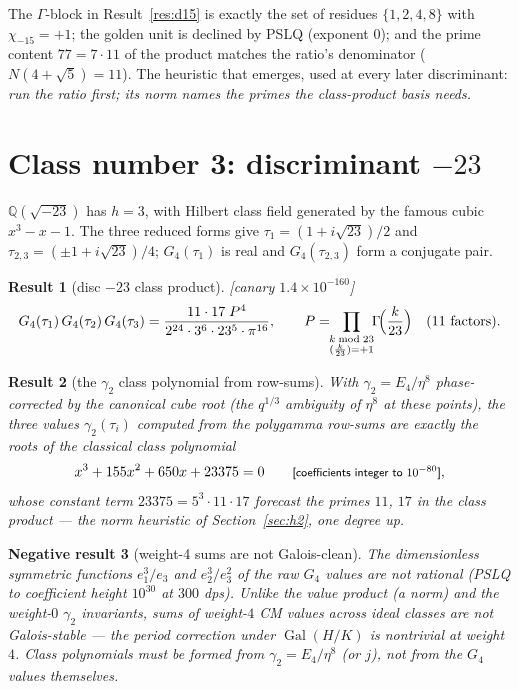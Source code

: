\documentclass[11pt]{article}
\newtheorem{result}{Result}[section]
\newtheorem{negative}[result]{Negative result}
\theoremstyle{remark}
\newcommand{\dps}[1]{\textsf{\footnotesize[#1]}}
\begin{document}
The $\Gamma$-block in Result~\ref{res:d15} is exactly the set of residues
$\{1,2,4,8\}$ with $\chi_{-15}=+1$; the golden unit is declined by PSLQ (exponent $0$); and
the prime content $77=7\cdot11$ of the product matches the ratio's denominator
($N(4+\sqrt5)=11$). The heuristic that emerges, used at every later discriminant:
\emph{run the ratio first; its norm names the primes the class-product basis needs.}

\section{Class number 3: discriminant \texorpdfstring{$-23$}{-23}}\label{sec:h3}

$\mathbb{Q}(\sqrt{-23})$ has $h=3$, with Hilbert class field generated by the famous cubic
$x^3-x-1$. The three reduced forms give $\tau_1=(1+i\sqrt{23})/2$ and
$\tau_{2,3}=(\pm1+i\sqrt{23})/4$; $G_4(\tau_1)$ is real and $G_4(\tau_{2,3})$ form a
conjugate pair.

\begin{result}[disc $-23$ class product]\label{res:d23}
\dps{canary $1.4\times10^{-160}$}
\[
G_4(\tau_1)\,G_4(\tau_2)\,G_4(\tau_3)
=\frac{11\cdot17\;P^4}{2^{24}\cdot3^6\cdot23^5\cdot\pi^{16}},\qquad
P=\!\!\prod_{\substack{k\bmod 23\\ (\frac{k}{23})=+1}}\!\!\Gamma\!\Bigl(\frac{k}{23}\Bigr)
\quad\text{(11 factors)}.
\]
\end{result}

\begin{result}[the $\gamma_2$ class polynomial from row-sums]\label{res:d23poly}
With $\gamma_2=E_4/\eta^8$ phase-corrected by the canonical cube root (the $q^{1/3}$
ambiguity of $\eta^8$ at these points), the three values $\gamma_2(\tau_i)$ computed from the
polygamma row-sums are exactly the roots of the classical class polynomial
\[
x^3+155x^2+650x+23375=0
\qquad\text{\dps{coefficients integer to $10^{-80}$}},
\]
whose constant term $23375=5^3\cdot11\cdot17$ forecast the primes $11$, $17$ in the class
product --- the norm heuristic of Section~\ref{sec:h2}, one degree up.
\end{result}

\begin{negative}[weight-4 sums are not Galois-clean]\label{neg:sums}
The dimensionless symmetric functions $e_1^3/e_3$ and $e_2^3/e_3^2$ of the raw $G_4$ values
are \emph{not} rational (PSLQ to coefficient height $10^{30}$ at $300$ dps). Unlike the value
\emph{product} (a norm) and the weight-$0$ $\gamma_2$ invariants, sums of weight-$4$ CM
values across ideal classes are not Galois-stable --- the period correction under
$\operatorname{Gal}(H/K)$ is nontrivial at weight $4$. Class polynomials must be formed from
$\gamma_2=E_4/\eta^8$ (or $j$), not from the $G_4$ values themselves.
\end{negative}
\end{document}

